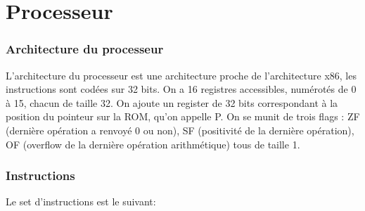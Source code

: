 \documentclass{article}
\begin{document}
\part*{Processeur}

\section*{Architecture du processeur}

L'architecture du processeur est une architecture proche de l'architecture x86,
les instructions sont codées sur 32 bits. On a 16 registres accessibles,
numérotés de 0 à 15, chacun de taille 32. On ajoute un register de 32
bits correspondant à la position du pointeur sur la ROM, qu'on appelle P.
On se munit de trois flags : ZF (dernière opération a renvoyé 0 ou non), SF
(positivité de la dernière opération), OF (overflow de la dernière
opération arithmétique) tous de taille 1.


\section*{Instructions}
 
Le set d'instructions est le suivant:
\end{document}

